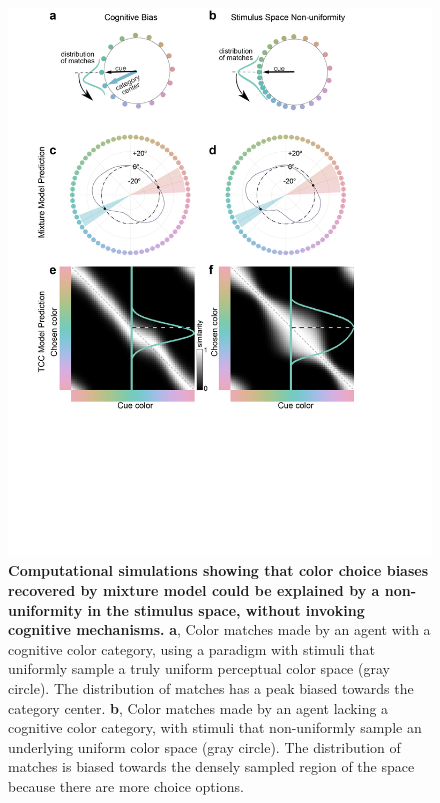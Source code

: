 \documentclass[9pt,biorxiv,lineno,onehalfspacing]{lapreprint}
\begin{document}
\begin{refsection}
\begin{figure}
    \begin{fullwidth}
    \centering
    \includegraphics[width=\textwidth,trim={0 7cm 0 0},clip]{Outputs/Paper/Figures/flat/F3_TCCModel_7.png}
    \caption{\textbf{Computational simulations showing that color choice biases recovered by mixture model \citep{zhang_discrete_2008, bae_why_2015} could be explained by a non-uniformity in the stimulus space, without invoking cognitive mechanisms.} 
    \textbf{a}, Color matches made by an agent with a cognitive color category, using a paradigm with stimuli that uniformly sample a truly uniform perceptual color space (gray circle). 
    The distribution of matches has a peak biased towards the category center.
    \textbf{b}, Color matches made by an agent lacking a cognitive color category, with stimuli that non-uniformly sample an underlying uniform color space (gray circle). 
    The distribution of matches is biased towards the densely sampled region of the space because there are more choice options. 
}
\end{fullwidth}
\end{figure}
\end{refsection}
\end{document}
